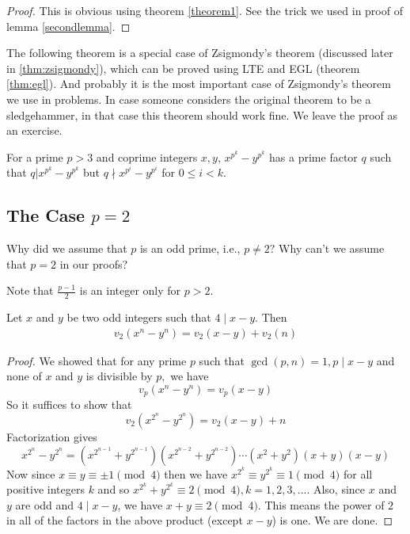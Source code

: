     \begin{proof}
        This is obvious using theorem \eqref{theorem1}. See the trick we used in proof of lemma \eqref{secondlemma}.
	\end{proof}

    The following theorem is a  special case of Zsigmondy's theorem (discussed later in \eqref{thm:zsigmondy}), which can be proved using LTE and EGL (theorem \eqref{thm:egl}). And probably it is the most important case of Zsigmondy's theorem  we use in problems. In case someone considers the original theorem to be a sledgehammer, in that case this theorem should work fine. We leave the proof as an exercise.

    \begin{theorem}
    	For a prime $p>3$ and coprime integers $x,y$, $x^{p^k}-y^{p^k}$ has a prime factor $q$ such that $q|x^{p^k}-y^{p^k}$ but $q\nmid x^{p^i}-y^{p^i}$ for $0\le i<k$.
    \end{theorem}


\subsection{The Case \texorpdfstring{${p=2}$}{p = 2}}

    \begin{question}
        Why did we assume that $p$ is an odd prime, i.e., $p \neq 2 ?$ Why can't we assume that $p=2$ in our proofs?
    \end{question}

    \begin{hint}
        Note that $\frac{p-1}{2}$ is an integer only for $p>2.$
    \end{hint}


    \begin{theorem}[LTE for $p = 2$]
        Let $x$ and $y$ be two odd integers such that $4 \mid x-y.$ Then
         \begin{align*}
         	v_2  \left(x^n - y^n \right) = v_2  (x-y ) + v_2  (n )
         \end{align*}
    \end{theorem}

    \begin{proof}
        We showed that for any prime $p$ such that $\gcd(p,n)=1, p \mid x-y$ and  none of $x$ and $y$ is divisible by $p,$ we have
            \[v_p(  x^n - y^n ) = v_p(  x - y )\]
        So it suffices to show that
            \[v_2(  x^{2^{n}} - y^{2^{n}} ) = v_2(  x-y ) + n\]
        Factorization gives
            \[x^{2^{n}} - y^{2^{n}} = (x^{2^{n-1}} + y^{2^{n-1}})(x^{2^{n-2}} + y^{2^{n-2}}) \cdots (x^2 + y^2 )(x + y)(x - y) \]
        Now since $x \equiv y \equiv \pm 1\pmod 4$ then we have $x^{2^{k}}  \equiv  y^{2^{k}} \equiv 1 \pmod 4$ for all positive integers $k$ and so $x^{2^{k}} + y^{2^{k}} \equiv 2 \pmod 4, k=1,2,3,\ldots.$ Also, since $x$ and $y$ are odd and $4\mid x-y$, we have $x+y \equiv 2\pmod 4$.
        This means the power of $2$ in all of the factors in the above product (except $x-y$) is one. We are done.
    \end{proof}


